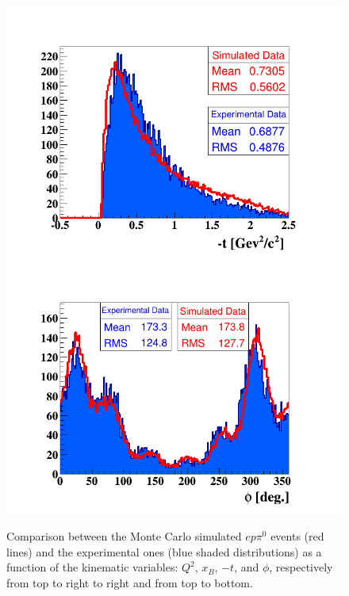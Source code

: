 \begin{figure}[h!]
\includegraphics[scale=0.35]{fig_dvcs/comp/t_InCoh_pi0.png}
\includegraphics[scale=0.35]{fig_dvcs/comp/phi_h_InCoh_pi0.png}
\caption{Comparison between the Monte Carlo simulated $ep\pi^{0}$ events (red lines) and the experimental ones (blue shaded distributions) as a function of the kinematic variables: $Q^{2}$, $x_{B}$, $-t$, and $\phi$, respectively from top to right to right and from top to bottom.}
\label{fig:incoh_pi0_comparison_with_simulation}
\end{figure}


